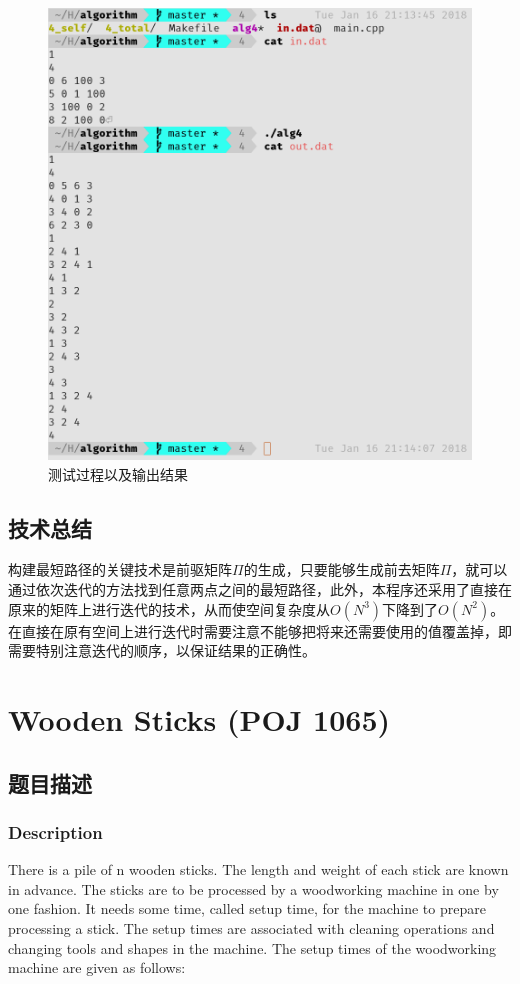 \documentclass{report}
\begin{document}
\begin{figure}[ht]
    \centering
    \includegraphics[width=0.8\linewidth]{result4.png}
    \caption{测试过程以及输出结果}
    \label{fig:result4}
\end{figure}

\section{技术总结}
\label{sec:ji_zhu_zong_jie_4}
构建最短路径的关键技术是前驱矩阵$\Pi$的生成，只要能够生成前去矩阵$\Pi$，就可以通过依次迭代的方法找到任意两点之间的最短路径，此外，本程序还采用了直接在原来的矩阵上进行迭代的技术，从而使空间复杂度从$O(N^3)$下降到了$O(N^2)$。在直接在原有空间上进行迭代时需要注意不能够把将来还需要使用的值覆盖掉，即需要特别注意迭代的顺序，以保证结果的正确性。\par

\chapter{Wooden Sticks (POJ 1065)}
\label{cha:wooden_sticks_poj_1065_}

\section{题目描述}
\label{sec:ti_mu_miao_shu_5}

\subsection{Description}
There is a pile of n wooden sticks. The length and weight of each stick are known in advance. The sticks are to be processed by a woodworking machine in one by one fashion. It needs some time, called setup time, for the machine to prepare processing a stick. The setup times are associated with cleaning operations and changing tools and shapes in the machine. The setup times of the woodworking machine are given as follows:\par
\end{document}
